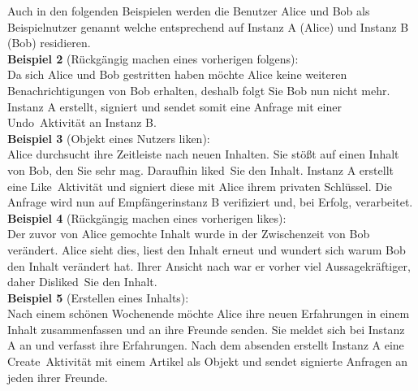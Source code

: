 Auch in den folgenden Beispielen werden die Benutzer Alice und Bob als Beispielnutzer genannt welche entsprechend auf Instanz A (Alice) und Instanz B (Bob) residieren.\\

\textbf{Beispiel 2} (Rückgängig machen eines vorherigen folgens):\\
Da sich Alice und Bob gestritten haben möchte Alice keine weiteren Benachrichtigungen von Bob erhalten, deshalb folgt Sie Bob nun nicht mehr. Instanz A erstellt, signiert und sendet somit eine Anfrage mit einer \glqq Undo\grqq~Aktivität an Instanz B.\\

\textbf{Beispiel 3} (Objekt eines Nutzers \glqq liken\grqq):\\
Alice durchsucht ihre Zeitleiste nach neuen Inhalten. Sie stößt auf einen Inhalt von Bob, den Sie sehr mag. Daraufhin \glqq liked\grqq~Sie den Inhalt. Instanz A erstellt eine \glqq Like\grqq~Aktivität und signiert diese mit Alice ihrem privaten Schlüssel. Die Anfrage wird nun auf Empfängerinstanz B verifiziert und, bei Erfolg, verarbeitet.\\

\textbf{Beispiel 4} (Rückgängig machen eines vorherigen \glqq likes\grqq):\\
Der zuvor von Alice gemochte Inhalt wurde in der Zwischenzeit von Bob verändert. Alice sieht dies, liest den Inhalt erneut und wundert sich warum Bob den Inhalt verändert hat. Ihrer Ansicht nach war er vorher viel Aussagekräftiger, daher \glqq Disliked\grqq~Sie den Inhalt.\\

\textbf{Beispiel 5} (Erstellen eines Inhalts):\\
Nach einem schönen Wochenende möchte Alice ihre neuen Erfahrungen in einem Inhalt zusammenfassen und an ihre Freunde senden. Sie meldet sich bei Instanz A an und verfasst ihre Erfahrungen. Nach dem absenden erstellt Instanz A eine \glqq Create\grqq~Aktivität mit einem Artikel als Objekt und sendet signierte Anfragen an jeden ihrer Freunde.
